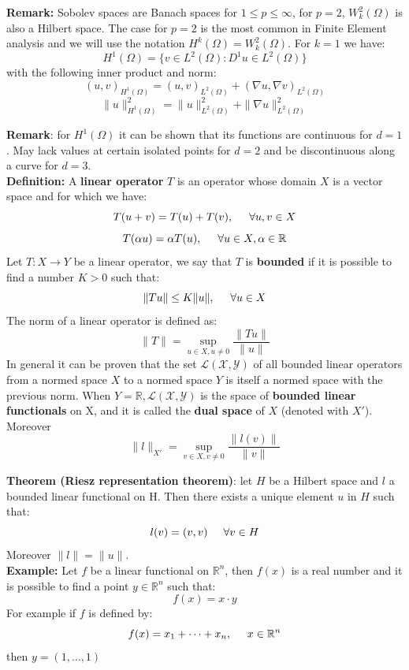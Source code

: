 \textbf{Remark:} Sobolev spaces are Banach spaces for $1 \leq p \leq \infty$, for $p=2$, $W_k^2(\Omega)$ is also a Hilbert space. The case for $p=2$ is the most common in Finite Element analysis and we will use the notation $H^k(\Omega) = W_k^2(\Omega)$. For $k=1$ we have:
\[
    H^1(\Omega) = \{v \in L^2(\Omega): D^1u \in L^2(\Omega)\}    
\]
with the following inner product and norm:
\[
    (u,v)_{H^1(\Omega)} = (u,v)_{L^2(\Omega)} + (\nabla u, \nabla v)_{L^2(\Omega)}    
\]
\[
    \|u\|_{H^1(\Omega)}^2 = \|u\|^2_{L^2(\Omega)} + \|\nabla u\|^2_{L^2(\Omega)}   
\]

\textbf{Remark}: for $H^1(\Omega)$ it can be shown that its functions are continuous for $d=1$.  May lack values at certain isolated points for $d=2$ and be discontinuous along a curve for $d=3$.\\

\textbf{Definition: } A \textbf{linear operator} $T$ is an operator whose domain $X$ is a vector space and for which we have:
\[
    T(u+v) = T(u) + T(v), \hspace{0.5cm} \forall u,v \in X    
\]
\[
     T(\alpha u) = \alpha T(u), \hspace{0.5cm} \forall u \in X, \alpha \in \mathbb{R}   
\]
Let $T: X \to Y$ be a linear operator, we say that $T$ is \textbf{bounded} if it is possible to find a number $K > 0$ such that:
\[
    \|Tu\| \leq K\|u\|, \hspace{0.5cm} \forall u \in X    
\] 
The norm of a linear operator is defined as:
\[
    \|T\| = \sup_{u \in X, u \neq 0} \dfrac{\|Tu\|}{\|u\|}    
\]
In general it can be proven that the set $\mathcal{L}(\mathcal{X},\mathcal{Y})$ of all bounded linear operators from a normed space $X$ to a normed space $Y$ is itself a normed space with the previous norm. When $Y = \mathbb{R}, \mathcal{L}(\mathcal{X},\mathcal{Y})$ is the space of \textbf{bounded linear functionals} on X, and it is called the \textbf{dual space} of $X$ (denoted with $X'$). Moreover 
\[
    \|l\|_{X'} = \sup_{v \in X, v \neq 0} \dfrac{\|l(v)\|}{\|v\|}    
\]

\textbf{Theorem (Riesz representation theorem)}: let $H$ be a Hilbert space and $l$ a bounded linear functional on H. Then there exists a unique element $u$ in $H$ such that:
\[
    l(v) = (v,v) \hspace{0.5cm} \forall v \in H   
\]
Moreover $\|l\| = \|u\|$.\\

\textbf{Example: } Let $f$ be a linear functional on $\mathbb{R}^n$, then $f(x)$ is a real number and it is possible to find a point $y \in \mathbb{R}^n$ such that:
\[
    f(x) = x \cdot y    
\]
For example if $f$ is defined by:
\[
    f(x) = x_1 + \dots + x_n, \hspace{0.5cm} x \in \mathbb{R}^n
\]
then $y = (1, \dots, 1)$\\

